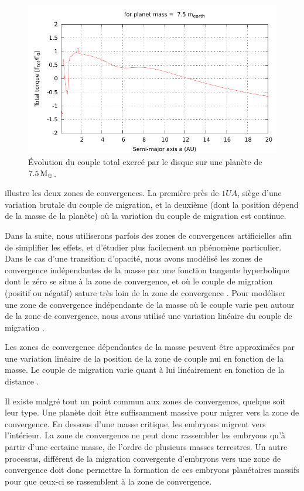 \begin{figure}[htbp]
\centering
\includegraphics[width=0.75\linewidth]{figure/total_torque_fixed_m.pdf}
\caption{Évolution du couple total exercé par
le disque sur une planète de $7.5\mathrm{\thinspace M_\oplus}$. }\label{fig:total_torque_fixed_m}
\end{figure}

 illustre les deux zones de convergences. La première près de $1\unit{UA}$, siège d'une
variation brutale du couple de migration, et la deuxième (dont la position dépend de la masse de la planète) où la variation du
couple de migration est continue. 

Dans la suite, nous utiliserons parfois des zones de convergences artificielles afin de simplifier les effets, et d'étudier
plus facilement un phénomène particulier. Dans le cas d'une transition d'opacité, nous avons modélisé les zones de convergence
indépendantes de la masse par une fonction tangente hyperbolique dont le zéro se situe à la zone de convergence, et où le couple de
migration (positif ou négatif) sature très loin de la zone de convergence . Pour modéliser une zone de
convergence indépendante de la masse où le couple varie peu autour de la zone de convergence, nous avons utilisé une variation
linéaire du couple de migration .

Les zones de convergence dépendantes de la masse peuvent être approximées par une variation linéaire de la position de la zone
de couple nul en fonction de la masse. Le couple de migration varie quant à lui linéairement en fonction de la distance
. 

\bigskip

Il existe malgré tout un point commun aux zones de convergence, quelque soit leur type. Une planète doit être suffisamment massive pour migrer vers la zone de convergence. En dessous d'une masse critique, les embryons migrent vers l'intérieur. La zone de convergence ne peut donc rassembler les embryons qu'à partir d'une certaine masse, de l'ordre de plusieurs masses terrestres. Un autre processus, différent de la migration convergente d'embryons vers une zone de convergence doit donc permettre la formation de ces embryons planétaires massifs pour que ceux-ci se rassemblent à la zone de convergence.

